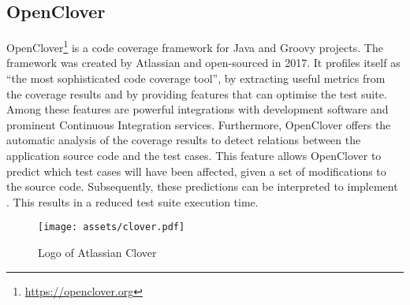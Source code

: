 
\subsection{OpenClover}
OpenClover\footnote{\url{https://openclover.org}} is a code coverage framework for Java and Groovy projects. The framework was created by Atlassian and open-sourced in 2017. It profiles itself as ``the most sophisticated code coverage tool'', by extracting useful metrics from the coverage results and by providing features that can optimise the test suite. Among these features are powerful integrations with development software and prominent Continuous Integration services. Furthermore, OpenClover offers the automatic analysis of the coverage results to detect relations between the application source code and the test cases. This feature allows OpenClover to predict which test cases will have been affected, given a set of modifications to the source code. Subsequently, these predictions can be interpreted to implement \tcs{}. This results in a reduced test suite execution time.

\begin{figure}[htbp!]
	\centering
	\texttt{[image: assets/clover.pdf]}
	\caption{Logo of Atlassian Clover}
\end{figure}